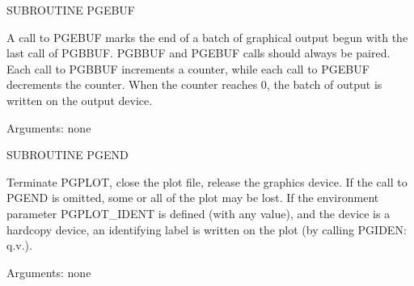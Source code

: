 {\eightpoint\begintt
      SUBROUTINE PGEBUF
 
A call to PGEBUF marks the end of a batch of graphical output begun
with the last call of PGBBUF.  PGBBUF and PGEBUF calls should always
be paired. Each call to PGBBUF increments a counter, while each call
to PGEBUF decrements the counter. When the counter reaches 0, the
batch of output is written on the output device.
 
Arguments: none
\endtt}

{\eightpoint\begintt
      SUBROUTINE PGEND
 
Terminate PGPLOT, close the plot file, release the graphics
device.  If the call to PGEND is omitted, some or all of the plot
may be lost. If the environment parameter PGPLOT_IDENT is defined 
(with any value), and the device is a hardcopy device, an
identifying label is written on the plot (by calling PGIDEN: q.v.).
 
Arguments: none
\endtt}

